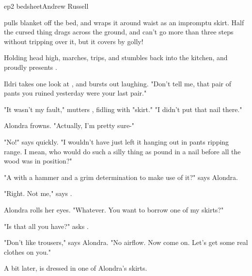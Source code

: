 \documentclass{book}
\begin{document}
\begin{childnode}{ep2 bedsheet}{Andrew Russell}

    \name{} pulls \hisher{} blanket off the bed, and wraps it around \hisher{} waist as an impromptu skirt. Half the cursed thing drags across the ground, and \heshe{} can't go more than three
    steps without tripping over it, but it covers \himher{} by golly!

    Holding \hisher{} head high, \name{} marches, trips, and stumbles back into the kitchen, and proudly presents \himselfherself{}.

    Ildri takes one look at \name{}, and bursts out laughing. "Don't tell me, that pair of pants you ruined yesterday were your last pair."

    "It wasn't my fault," mutters \name{}, fidling with \hisher{} "skirt." "I didn't put that nail there."

    Alondra frowns. "Actually, I'm pretty sure-"

    "No!" says \name{} quickly. "I wouldn't have just left it hanging out in pants ripping range. I mean, who would do such a silly thing as pound in a nail before all the wood was in position?"

    "A \manwoman{} with a hammer and a grim determination to make use of it?" says Alondra.

    "Right. Not me," says \name{}.

    Alondra rolls her eyes. "Whatever. You want to borrow one of my skirts?"

    "Is that all you have?" asks \name{}.

    "Don't like trousers," says Alondra. "No airflow. Now come on. Let's get some real clothes on you."

    A bit later, \name{} is dressed in one of Alondra's skirts. 




\end{childnode}
\end{document}

